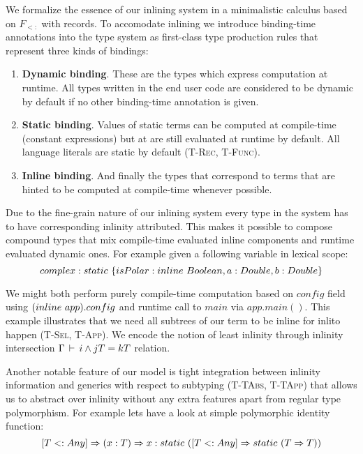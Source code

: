 We formalize the essence of our inlining system in a minimalistic calculus based 
on $F_{<:}$ with records. To accomodate inlining we introduce binding-time annotations 
into the type system as first-class type production rules that represent three kinds 
of bindings:

\begin{enumerate}
  \item \textbf{Dynamic binding}. These are the types which express computation at runtime.
        All types written in the end user code are considered to be dynamic by default if
        no other binding-time annotation is given.

  \item \textbf{Static binding}. Values of static terms can be computed at compile-time
        (\eg constant expressions) but at are still evaluated at runtime by default.
        All language literals are static by default (\textsc{T-Rec}, \textsc{T-Func}).

  \item \textbf{Inline binding}. And finally the types that correspond to terms that
        are hinted to be computed at compile-time whenever possible. 
\end{enumerate}

\iffalse
Due to the fine-grain nature of our inlining system every type in the system has to 
have corresponding inlinity attributed. This makes it possible to compose compound
types that mix compile-time evaluated inline components and runtime evaluated dynamic
ones. For example given a following variable in lexical scope:  
\begin{equation}\nonumber
    complex: static\ \{ isPolar: inline\ Boolean, a: Double, b: Double \} 
\end{equation}

We might both perform purely compile-time computation based on $config$ field 
using $(inline\ app).config$ and runtime call to $main$ via $app.main()$. This example 
illustrates that we need all subtrees of our term to be inline for inli\fng to happen 
(\textsc{T-Sel}, \textsc{T-App}). We encode the notion of least inlinity through inlinity
intersection $\Gamma \,\vdash\, i \wedge j T = k T$ relation.

Another notable feature of our model is tight integration between inlinity information and
generics with respect to subtyping (\textsc{T-TAbs}, \textsc{T-TApp}) that allows us to
abstract over inlinity without any extra features apart from regular type polymorphism.
For example lets have a look at simple polymorphic identity function:
\begin{equation}\nonumber
    [T <: Any] \Rightarrow (x: T) \Rightarrow x: static\ ([T <: Any] \Rightarrow static\ (T \Rightarrow T))
\end{equation}


